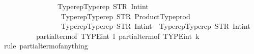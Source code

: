 \begin{isabellebody}
\ \ \ \ \ \ \ \ \ \ \ \ \ \ \ \ {\isacharbrackleft}{\kern0pt}Typerep{\isachardot}{\kern0pt}Typerep\ {\isacharparenleft}{\kern0pt}STR\ {\isacharprime}{\kern0pt}{\isacharprime}{\kern0pt}Int{\isachardot}{\kern0pt}int{\isacharprime}{\kern0pt}{\isacharprime}{\kern0pt}{\isacharparenright}{\kern0pt}\ {\isacharbrackleft}{\kern0pt}{\isacharbrackright}{\kern0pt}{\isacharcomma}{\kern0pt}\isanewline
\ \ \ \ \ \ \ \ \ \ \ \ \ \ \ \ \ Typerep{\isachardot}{\kern0pt}Typerep\ {\isacharparenleft}{\kern0pt}STR\ {\isacharprime}{\kern0pt}{\isacharprime}{\kern0pt}Product{\isacharunderscore}{\kern0pt}Type{\isachardot}{\kern0pt}prod{\isacharprime}{\kern0pt}{\isacharprime}{\kern0pt}{\isacharparenright}{\kern0pt}\isanewline
\ \ \ \ \ \ \ \ \ \ \ \ \ \ \ \ \ {\isacharbrackleft}{\kern0pt}Typerep{\isachardot}{\kern0pt}Typerep\ {\isacharparenleft}{\kern0pt}STR\ {\isacharprime}{\kern0pt}{\isacharprime}{\kern0pt}Int{\isachardot}{\kern0pt}int{\isacharprime}{\kern0pt}{\isacharprime}{\kern0pt}{\isacharparenright}{\kern0pt}\ {\isacharbrackleft}{\kern0pt}{\isacharbrackright}{\kern0pt}{\isacharcomma}{\kern0pt}\ Typerep{\isachardot}{\kern0pt}Typerep\ {\isacharparenleft}{\kern0pt}STR\ {\isacharprime}{\kern0pt}{\isacharprime}{\kern0pt}Int{\isachardot}{\kern0pt}int{\isacharprime}{\kern0pt}{\isacharprime}{\kern0pt}{\isacharparenright}{\kern0pt}\ {\isacharbrackleft}{\kern0pt}{\isacharbrackright}{\kern0pt}{\isacharbrackright}{\kern0pt}{\isacharbrackright}{\kern0pt}{\isacharbrackright}{\kern0pt}{\isacharparenright}{\kern0pt}{\isacharparenright}{\kern0pt}\isanewline
\ \ \ \ \ \ \ \ \ \ {\isacharparenleft}{\kern0pt}partial{\isacharunderscore}{\kern0pt}term{\isacharunderscore}{\kern0pt}of\ {\isacharparenleft}{\kern0pt}TYPE{\isacharparenleft}{\kern0pt}int{\isacharparenright}{\kern0pt}{\isacharparenright}{\kern0pt}\ l{\isacharparenright}{\kern0pt}{\isacharparenright}{\kern0pt}\ {\isacharparenleft}{\kern0pt}partial{\isacharunderscore}{\kern0pt}term{\isacharunderscore}{\kern0pt}of\ {\isacharparenleft}{\kern0pt}TYPE{\isacharparenleft}{\kern0pt}int{\isacharparenright}{\kern0pt}{\isacharparenright}{\kern0pt}\ k{\isacharparenright}{\kern0pt}{\isacharparenright}{\kern0pt}{\isachardoublequoteclose}\isanewline
%
\isadelimproof
\ \ %
\endisadelimproof
%
\isatagproof
{}\isamarkupfalse%
\ {\isacharparenleft}{\kern0pt}rule\ partial{\isacharunderscore}{\kern0pt}term{\isacharunderscore}{\kern0pt}of{\isacharunderscore}{\kern0pt}anything{\isacharparenright}{\kern0pt}{\isacharplus}{\kern0pt}%
\endisatagproof
{\isafoldproof}%
%
\isadelimproof
\isanewline
%
\endisadelimproof
\isanewline
{}\isamarkupfalse%

\end{isabellebody}
